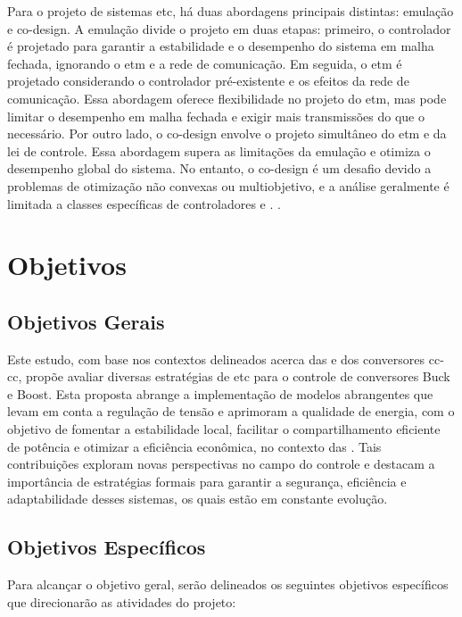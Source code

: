 Para o projeto de sistemas \acrshort{etc}, há duas abordagens principais distintas: emulação e co-design. A emulação divide o projeto em duas etapas: primeiro, o controlador é projetado para garantir a estabilidade e o desempenho do sistema em malha fechada, ignorando o \acrshort{etm} e a rede de comunicação. Em seguida, o \acrshort{etm} é projetado considerando o controlador pré-existente e os efeitos da rede de comunicação. Essa abordagem oferece flexibilidade no projeto do \acrshort{etm}, mas pode limitar o desempenho em malha fechada e exigir mais transmissões do que o necessário. Por outro lado, o co-design envolve o projeto simultâneo do \acrshort{etm} e da lei de controle. Essa abordagem supera as limitações da emulação e otimiza o desempenho global do sistema. No entanto, o co-design é um desafio devido a problemas de otimização não convexas ou multiobjetivo, e a análise geralmente é limitada a classes específicas de controladores e . \cite{coutinho2021}.


\section{Objetivos}

\subsection{Objetivos Gerais}

Este estudo, com base nos contextos delineados acerca das  e dos conversores \acrshort{cc}-\acrshort{cc}, propõe avaliar diversas estratégias de \acrshort{etc} para o controle de conversores Buck e Boost. Esta proposta abrange a implementação de modelos abrangentes que levam em conta a regulação de tensão e aprimoram a qualidade de energia, com o objetivo de fomentar a estabilidade local, facilitar o compartilhamento eficiente de potência e otimizar a eficiência econômica, no contexto das . Tais contribuições exploram novas perspectivas no campo do controle e destacam a importância de estratégias formais para garantir a segurança, eficiência e adaptabilidade desses sistemas, os quais estão em constante evolução.

\subsection{Objetivos Específicos}
Para alcançar o objetivo geral, serão delineados os seguintes objetivos específicos que direcionarão as atividades do projeto:

